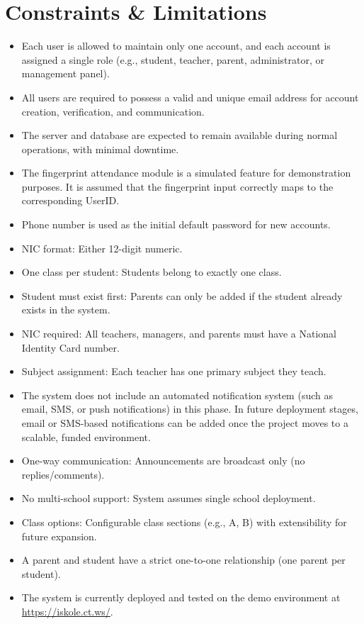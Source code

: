 \documentclass[12pt, a4paper]{report}
\begin{document}
\section{Constraints \& Limitations}

\begin{itemize}
    \item Each user is allowed to maintain only one account, and each account is assigned a single role (e.g., student, teacher, parent, administrator, or management panel).
    \item All users are required to possess a valid and unique email address for account creation, verification, and communication.
    \item The server and database are expected to remain available during normal operations, with minimal downtime.
    \item The fingerprint attendance module is a simulated feature for demonstration purposes. It is assumed that the fingerprint input correctly maps to the corresponding UserID.
    \item Phone number is used as the initial default password for new accounts.
    \item NIC format: Either 12-digit numeric.
    \item One class per student: Students belong to exactly one class.
    \item Student must exist first: Parents can only be added if the student already exists in the system.
    \item NIC required: All teachers, managers, and parents must have a National Identity Card number.
    \item Subject assignment: Each teacher has one primary subject they teach.
    \item The system does not include an automated notification system (such as email, SMS, or push notifications) in this phase. In future deployment stages, email or SMS-based notifications can be added once the project moves to a scalable, funded environment.
    \item One-way communication: Announcements are broadcast only (no replies/comments).
    \item No multi-school support: System assumes single school deployment.
    \item Class options: Configurable class sections (e.g., A, B) with extensibility for future expansion.
    \item A parent and student have a strict one-to-one relationship (one parent per student).
    \item The system is currently deployed and tested on the demo environment at \url{https://iskole.ct.ws/}.
\end{itemize}
\end{document}
